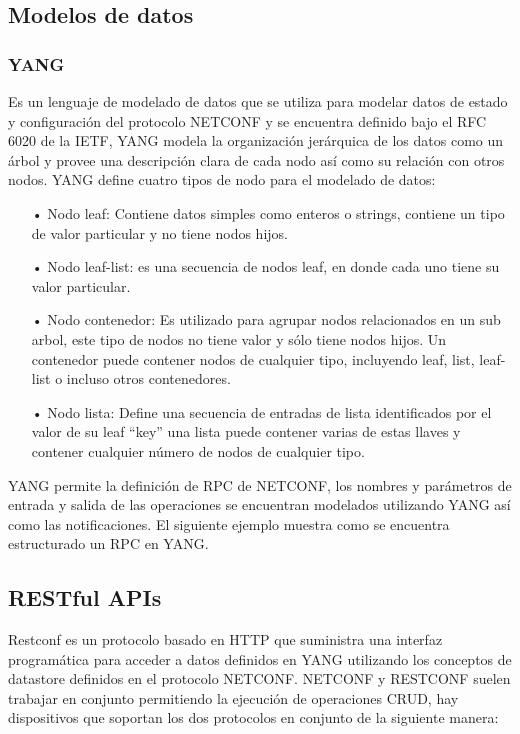 \subsection{Modelos de datos}
\label{sec:Modelos de datos}

\subsubsection{YANG}
\label{sec:YANG}


Es un lenguaje de modelado de datos que se utiliza para modelar datos de estado y configuración del protocolo NETCONF y se encuentra definido bajo el RFC 6020 de la IETF, YANG modela la organización jerárquica de los datos como un árbol y provee una descripción clara de cada nodo así como su relación con otros nodos.
YANG define cuatro tipos de nodo para el modelado de datos:

\begin{itemize}
\item[•] Nodo leaf: Contiene datos simples como enteros o strings, contiene un tipo de valor particular y no tiene nodos hijos.
\item[•]Nodo leaf-list: es una secuencia de nodos leaf, en donde cada uno tiene su valor particular.
\item[•]Nodo contenedor: Es utilizado para agrupar nodos relacionados en un sub arbol, este tipo de nodos no tiene valor y sólo tiene nodos hijos. Un contenedor puede contener nodos de cualquier tipo, incluyendo leaf, list, leaf-list o incluso otros contenedores.
\item[•]Nodo lista: Define una secuencia de entradas de lista identificados por el valor de su leaf “key” una lista puede contener varias de estas llaves y contener cualquier número de nodos de cualquier tipo.

\end{itemize}

YANG permite la definición de RPC de NETCONF, los nombres y parámetros de entrada y salida de las operaciones se encuentran modelados utilizando YANG así como las notificaciones. El siguiente ejemplo muestra como se encuentra estructurado un RPC en YANG.


\subsection{RESTful APIs}
\label{sec:RESTful APIs}

Restconf es un protocolo basado en HTTP que suministra una interfaz programática para acceder a datos definidos en YANG utilizando los conceptos de datastore definidos en el protocolo NETCONF.
NETCONF y RESTCONF suelen trabajar en conjunto permitiendo la ejecución de operaciones CRUD, hay dispositivos que soportan los dos protocolos  en conjunto de la siguiente manera:

